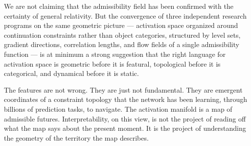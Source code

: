 \documentclass[12pt, a4paper]{article}
\theoremstyle{plain}
\theoremstyle{definition}
\theoremstyle{remark}
\begin{document}
We are not claiming that the admissibility field has been confirmed with the
certainty of general relativity. But the convergence of three independent
research programs on the same geometric picture --- activation space organized
around continuation constraints rather than object categories, structured
by level sets, gradient directions, correlation lengths, and flow fields of
a single admissibility function --- is at minimum a strong suggestion that
the right language for activation space is geometric before it is featural,
topological before it is categorical, and dynamical before it is static.

The features are not wrong. They are just not fundamental. They are emergent
coordinates of a constraint topology that the network has been learning,
through billions of prediction tasks, to navigate. The activation manifold is
a map of admissible futures. Interpretability, on this view, is not the
project of reading off what the map says about the present moment. It is the
project of understanding the geometry of the territory the map describes.
\end{document}
